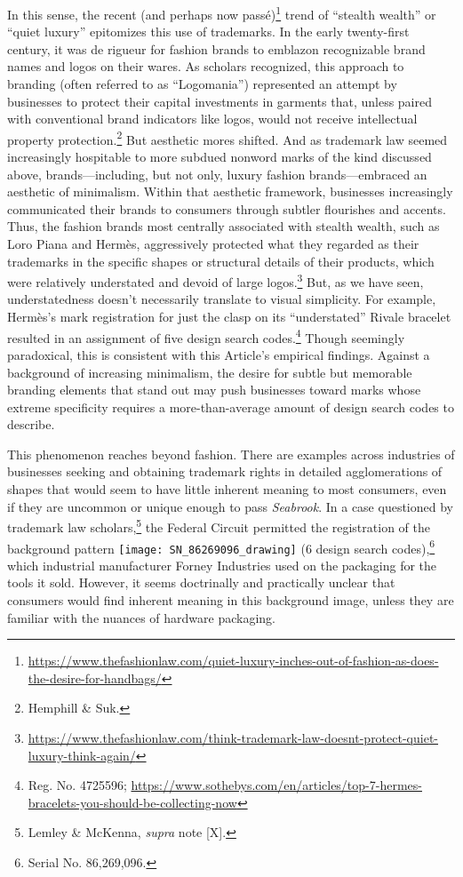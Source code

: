 \documentclass[letterpaper, 11pt, oneside]{article}
\begin{document}
In this sense, the recent (and perhaps now passé)\footnote{\url{https://www.thefashionlaw.com/quiet-luxury-inches-out-of-fashion-as-does-the-desire-for-handbags/}} trend of ``stealth wealth'' or ``quiet luxury'' epitomizes this use of trademarks. In the early twenty-first century, it was de rigueur for fashion brands to emblazon recognizable brand names and logos on their wares. As scholars recognized, this approach to branding (often referred to as ``Logomania'') represented an attempt by businesses to protect their capital investments in garments that, unless paired with conventional brand indicators like logos, would not receive intellectual property protection.\footnote{Hemphill \& Suk.} But aesthetic mores shifted. And as trademark law seemed increasingly hospitable to more subdued nonword marks of the kind discussed above, brands—including, but not only, luxury fashion brands—embraced an aesthetic of minimalism. Within that aesthetic framework, businesses increasingly communicated their brands to consumers through subtler flourishes and accents. Thus, the fashion brands most centrally associated with stealth wealth, such as Loro Piana and Hermès, aggressively protected what they regarded as their trademarks in the specific shapes or structural details of their products, which were relatively understated and devoid of large logos.\footnote{\url{https://www.thefashionlaw.com/think-trademark-law-doesnt-protect-quiet-luxury-think-again/}} But, as we have seen, understatedness doesn't necessarily translate to visual simplicity. For example, Hermès's mark registration for just the clasp on its ``understated'' Rivale bracelet resulted in an assignment of five design search codes.\footnote{Reg. No. 4725596; \url{https://www.sothebys.com/en/articles/top-7-hermes-bracelets-you-should-be-collecting-now}} Though seemingly paradoxical, this is consistent with this Article's empirical findings. Against a background of increasing minimalism, the desire for subtle but memorable branding elements that stand out may push businesses toward marks whose extreme specificity requires a more-than-average amount of design search codes to describe.

This phenomenon reaches beyond fashion. There are examples across industries of businesses seeking and obtaining trademark rights in detailed agglomerations of shapes that would seem to have little inherent meaning to most consumers, even if they are uncommon or unique enough to pass \textit{Seabrook}. In a case questioned by trademark law scholars,\footnote{Lemley \& McKenna, \textit{supra} note [X].} the Federal Circuit permitted the registration of the background pattern \texttt{[image: SN\_86269096\_drawing]} (6 design search codes),\footnote{Serial No. 86,269,096.} which industrial manufacturer Forney Industries used on the packaging for the tools it sold. However, it seems doctrinally and practically unclear that consumers would find inherent meaning in this background image, unless they are familiar with the nuances of hardware packaging.
\end{document}
